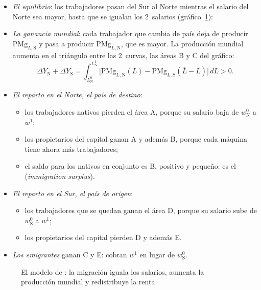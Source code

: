 \documentclass[11pt]{article}
\begin{document}
\begin{itemize}
\item \emph{El equilibrio}: los trabajadores pasan del Sur al Norte mientras el salario del Norte sea mayor, hasta que se igualan los 2~salarios (gráfico~\ref{fig:macdougall}):
\item \emph{La ganancia mundial}: cada trabajador que cambia de país deja de producir $\mathrm{PMg}_{L,\mathrm S}$ y pasa a producir $\mathrm{PMg}_{L,\mathrm N}$, que es mayor. La producción mundial aumenta en el triángulo entre las 2~curvas, las áreas B y C del gráfico:
\begin{equation}\label{eq:ganancia-mundial}
\Delta Y_{\mathrm N}+\Delta Y_{\mathrm S}=\int_{L^0_{\mathrm N}}^{L^1_{\mathrm N}}\Big[\mathrm{PMg}_{L,\mathrm N}(L)-\mathrm{PMg}_{L,\mathrm S}(\overline L-L)\Big]\,dL>0 .
\end{equation}
\item \emph{El reparto en el Norte, el país de destino}:
  \begin{itemize}
  \item los trabajadores nativos pierden el área A, porque su salario baja de $w^0_{\mathrm N}$ a $w^1$;
  \item los propietarios del capital ganan A y además B, porque cada máquina tiene ahora más trabajadores;
  \item el saldo para los nativos en conjunto es B, positivo y pequeño: es el  (\emph{immigration surplus})\nocite{Borjas1995Benefits}.
  \end{itemize}
\item \emph{El reparto en el Sur, el país de origen}:
  \begin{itemize}
  \item los trabajadores que se quedan ganan el área D, porque su salario sube de $w^0_{\mathrm S}$ a $w^1$;
  \item los propietarios del capital pierden D y además E.
  \end{itemize}
\item \emph{Los emigrantes} ganan C y E: cobran $w^1$ en lugar de $w^0_{\mathrm S}$.
\end{itemize}

\begin{figure}[H]
\centering
\caption{El modelo de : la migración iguala los salarios, aumenta la producción mundial y redistribuye la renta}\label{fig:macdougall}
\end{figure}
\end{document}
